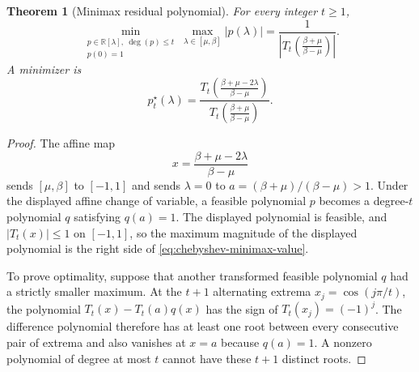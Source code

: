 \documentclass[11pt,twoside]{article}
\newcommand{\R}{\mathbb R}
\newtheorem{theorem}{Theorem}[section]
\theoremstyle{definition}
\theoremstyle{remark}
\begin{document}
\begin{theorem}[Minimax residual polynomial]
\label{thm:chebyshev-minimax}
For every integer $t\ge1$,
\begin{equation}
 \min_{\substack{p\in\R[\lambda],\ \deg(p)\le t\\p(0)=1}}
 \max_{\lambda\in[\mu,\beta]}|p(\lambda)|
 =
 \frac{1}{\left|T_t\left(\frac{\beta+\mu}{\beta-\mu}\right)\right|}.
 \label{eq:chebyshev-minimax-value}
\end{equation}
A minimizer is
\begin{equation}
 p_t^\star(\lambda)
 =\frac{T_t\left(\frac{\beta+\mu-2\lambda}{\beta-\mu}\right)}
        {T_t\left(\frac{\beta+\mu}{\beta-\mu}\right)}.
 \label{eq:chebyshev-polynomial}
\end{equation}
\end{theorem}

\begin{proof}
The affine map
\[
 x=\frac{\beta+\mu-2\lambda}{\beta-\mu}
\]
sends $[\mu,\beta]$ to $[-1,1]$ and sends $\lambda=0$ to
$a=(\beta+\mu)/(\beta-\mu)>1$. Under the displayed affine change of variable,
a feasible polynomial $p$ becomes a degree-$t$ polynomial $q$ satisfying
$q(a)=1$.
The displayed polynomial is feasible, and
$|T_t(x)|\le1$ on $[-1,1]$, so the maximum magnitude of the displayed
polynomial is the right side of
\cref{eq:chebyshev-minimax-value}.

To prove optimality, suppose that another transformed feasible polynomial
$q$ had a
strictly smaller maximum. At the $t+1$ alternating extrema
$x_j=\cos(j\pi/t)$, the polynomial
$T_t(x)-T_t(a)q(x)$ has the sign of $T_t(x_j)=(-1)^j$. The difference
polynomial therefore has at least one root between every consecutive pair of
extrema and also vanishes
at $x=a$ because $q(a)=1$. A nonzero polynomial of degree at most $t$ cannot
have these $t+1$ distinct roots.
\end{proof}
\end{document}
